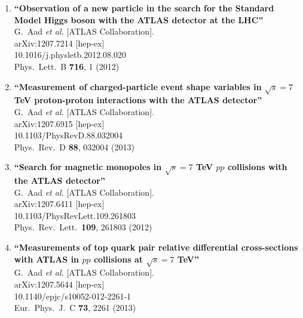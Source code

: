 \documentclass{article}
\begin{document}
\begin{enumerate}
\item%
{\bf ``Observation of a new particle in the search for the Standard Model Higgs boson with the ATLAS detector at the LHC''}
  \\{}G.~Aad {\it et al.}  [ATLAS Collaboration].
  \\{}arXiv:1207.7214 [hep-ex]
    \\{}10.1016/j.physletb.2012.08.020
\\{}Phys.\ Lett.\ B {\bf 716}, 1 (2012) %


\item%
{\bf ``Measurement of charged-particle event shape variables in $\sqrt{s}=7$ TeV proton-proton interactions with the ATLAS detector''}
  \\{}G.~Aad {\it et al.}  [ATLAS Collaboration].
  \\{}arXiv:1207.6915 [hep-ex]
    \\{}10.1103/PhysRevD.88.032004
\\{}Phys.\ Rev.\ D {\bf 88}, 032004 (2013) %


\item%
{\bf ``Search for magnetic monopoles in $\sqrt{s}=7$ TeV $pp$ collisions with the ATLAS detector''}
  \\{}G.~Aad {\it et al.}  [ATLAS Collaboration].
  \\{}arXiv:1207.6411 [hep-ex]
    \\{}10.1103/PhysRevLett.109.261803
\\{}Phys.\ Rev.\ Lett.\  {\bf 109}, 261803 (2012) %


\item%
{\bf ``Measurements of top quark pair relative differential cross-sections with ATLAS in $pp$ collisions at $\sqrt{s}=7$ TeV''}
  \\{}G.~Aad {\it et al.}  [ATLAS Collaboration].
  \\{}arXiv:1207.5644 [hep-ex]
    \\{}10.1140/epjc/s10052-012-2261-1
\\{}Eur.\ Phys.\ J.\ C {\bf 73}, 2261 (2013) %



\end{enumerate}
\end{document}
